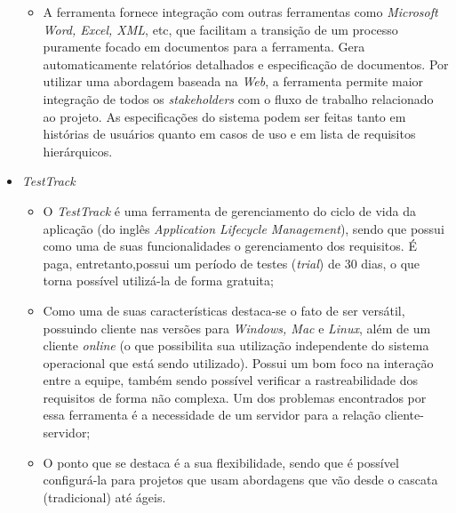 \begin{itemize}
\begin{itemize}
       \item
	  
	  A ferramenta fornece integração com outras ferramentas como \textit{Microsoft Word, Excel, XML}, etc, que facilitam
	  a transição de um processo puramente focado em documentos para a ferramenta. Gera automaticamente relatórios detalhados e
	  especificação de documentos. Por utilizar uma abordagem baseada na \textit{Web}, a ferramenta permite maior integração
	  de todos os \textit{stakeholders} com o fluxo de trabalho relacionado ao projeto. As especificações do sistema podem ser
	  feitas tanto em histórias de usuários quanto em casos de uso e em lista de requisitos hierárquicos.

      \end{itemize}

    \item \textit{TestTrack \footnotemark}
	
      \begin{itemize}

	\item 
	
	    O \textit{TestTrack} é uma ferramenta de gerenciamento do ciclo de vida da aplicação 
	    (do inglês \textit{Application Lifecycle Management}), sendo que possui como uma de suas funcionalidades
	    o gerenciamento dos requisitos. É paga, entretanto,possui um período de testes (\textit{trial}) de 30 dias,
	    o que torna possível utilizá-la de forma gratuita;
	    
	\item
	
	    Como uma de suas características destaca-se o fato de ser versátil, possuindo cliente nas versões para \textit{Windows, Mac} e
	    \textit{Linux}, além de um cliente \textit{online} (o que possibilita sua utilização independente do sistema operacional que está
	    sendo utilizado). Possui um bom foco na interação entre a equipe, também sendo possível verificar a rastreabilidade
	    dos requisitos de forma não complexa. Um dos problemas encontrados por essa ferramenta é a necessidade de um
	    servidor para a relação cliente-servidor;
	
	\item
	
	    O ponto que se destaca é a sua flexibilidade, sendo que é possível configurá-la para projetos que usam abordagens
	    que vão desde o cascata (tradicional) até ágeis.
	    

\end{itemize}
\end{itemize}
